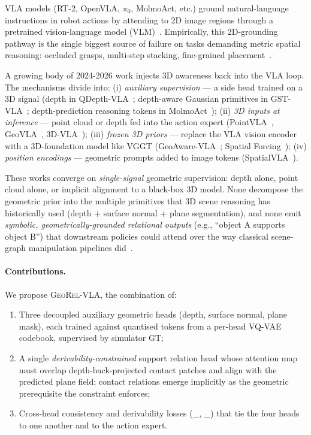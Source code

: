 \documentclass{article}
\newcommand{\geore}{\textsc{GeoRel-VLA}\xspace}
\newcommand{\Lxc}{\mathcal{L}_{\mathrm{xc}}}
\newcommand{\Ldr}{\mathcal{L}_{\mathrm{dr}}}
\begin{document}
VLA models (RT-2, OpenVLA, $\pi_0$, MolmoAct, etc.) ground natural-language instructions in robot actions by attending to 2D image regions through a pretrained vision-language model (VLM)~\citep{kim2024openvla,black2024pi0,molmoact2025}. Empirically, this 2D-grounding pathway is the single biggest source of failure on tasks demanding metric spatial reasoning: occluded grasps, multi-step stacking, fine-grained placement~\citep{li2025qdepthvla,sun2025geovla}.

A growing body of 2024-2026 work injects 3D awareness back into the VLA loop. The mechanisms divide into:
(i) \emph{auxiliary supervision} — a side head trained on a 3D signal (depth in QDepth-VLA~\citep{li2025qdepthvla}; depth-aware Gaussian primitives in GST-VLA~\citep{sarowar2026gstvla}; depth-prediction reasoning tokens in MolmoAct~\citep{molmoact2025});
(ii) \emph{3D inputs at inference} — point cloud or depth fed into the action expert (PointVLA~\citep{li2025pointvla}, GeoVLA~\citep{sun2025geovla}, 3D-VLA~\citep{zhen2024threedvla});
(iii) \emph{frozen 3D priors} — replace the VLA vision encoder with a 3D-foundation model like VGGT (GeoAware-VLA~\citep{geoaware2025}; Spatial Forcing~\citep{spatialforcing2026});
(iv) \emph{position encodings} — geometric prompts added to image tokens (SpatialVLA~\citep{qu2025spatialvla}).

These works converge on \emph{single-signal} geometric supervision: depth alone, point cloud alone, or implicit alignment to a black-box 3D model. None decompose the geometric prior into the multiple primitives that 3D scene reasoning has historically used (depth + surface normal + plane segmentation), and none emit \emph{symbolic, geometrically-grounded relational outputs} (e.g., ``object A supports object B'') that downstream policies could attend over the way classical scene-graph manipulation pipelines did~\citep{guo2021gvmrn,nguyen2020scenegraph}.

\paragraph{Contributions.} We propose \geore, the combination of:
\begin{enumerate}[leftmargin=*,topsep=2pt,itemsep=2pt]
  \item Three decoupled auxiliary geometric heads (depth, surface normal, plane mask), each trained against quantised tokens from a per-head VQ-VAE codebook, supervised by simulator GT;
  \item A single \emph{derivability-constrained} support relation head whose attention map must overlap depth-back-projected contact patches and align with the predicted plane field; contact relations emerge implicitly as the geometric prerequisite the constraint enforces;
  \item Cross-head consistency and derivability losses (\Lxc, \Ldr) that tie the four heads to one another and to the action expert.
\end{enumerate}
\end{document}
